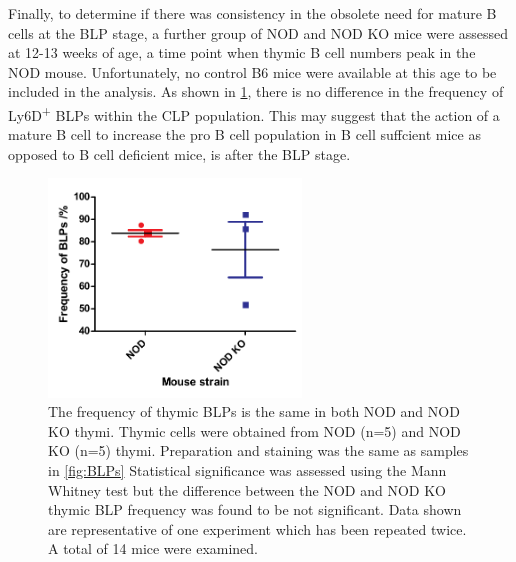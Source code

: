 Finally, to determine if there was consistency in the obsolete need for mature B cells at the BLP stage, a further group of NOD and NOD KO mice were assessed at 12-13 weeks of age, a time point when thymic B cell numbers peak in the NOD mouse. 
Unfortunately, no control B6 mice were available at this age to be included in the analysis.
As shown in \cref{fig:olderBLPs}, there is no difference in the frequency of Ly6D\textsuperscript{+} BLPs within the CLP population.
This may suggest that the action of a mature B cell to increase the pro B cell population in B cell suffcient mice as opposed to B cell deficient mice, is after the BLP stage.

\begin{figure}
\centering
\includegraphics[width=0.6\textwidth]{Figures/NODvKOBLPs.pdf}
\caption[The frequency of thymic BLPs is the same in both NOD and NOD KO thymi]{The frequency of thymic BLPs is the same in both NOD and NOD KO thymi.
Thymic cells were obtained from NOD (n=5) and NOD KO (n=5) thymi. Preparation and staining was the same as samples in \cref{fig:BLPs}
Statistical significance was assessed using the Mann Whitney test but the difference between the NOD and NOD KO thymic BLP frequency was found to be not significant.
Data shown are representative of one experiment which has been repeated twice. A total of 14 mice were examined.}
\label{fig:olderBLPs}
\end{figure}






